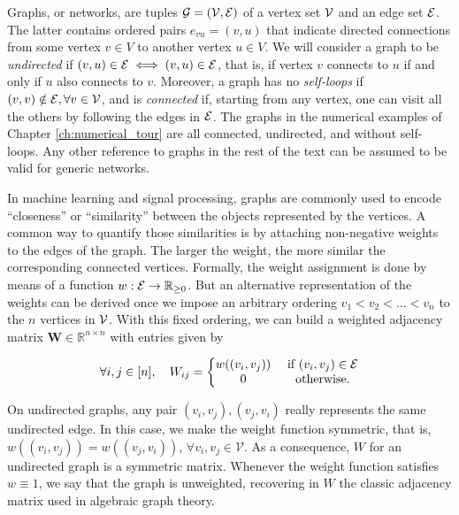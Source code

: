 Graphs, or networks, are tuples $\mathcal{G} = (\mathcal{V}, \mathcal{E})$ of a vertex set $\mathcal{V}$ and an edge set $\mathcal{E}$. The latter contains ordered pairs $e_{vu} = (v, u)$ that indicate directed connections from some vertex $v \in V$ to another vertex $u \in V$. We will consider a graph to be \textit{undirected} if $(v, u) \in \mathcal{E} \iff (v, u) \in \mathcal{E}$, that is, if vertex $v$ connects to $u$ if and only if $u$ also connects to $v$. Moreover, a graph has no \emph{self-loops} if $(v, v) \notin \mathcal{E}, \forall v \in \mathcal{V}$, and is \emph{connected} if, starting from any vertex, one can visit all the others by following the edges in $\mathcal{E}$. The graphs in the numerical examples of Chapter \ref{ch:numerical_tour} are all connected, undirected, and without self-loops. Any other reference to graphs in the rest of the text can be assumed to be valid for generic networks.

In machine learning and signal processing, graphs are commonly used to encode ``closeness'' or ``similarity'' between the objects represented by the vertices. A common way to quantify those similarities is by attaching non-negative weights to the edges of the graph. The larger the weight, the more similar the corresponding connected vertices. Formally, the weight assignment is done by means of a function $w : \mathcal{E} \to \mathbb{R}_{\ge 0}$. But an alternative representation of the weights can be derived once we impose an arbitrary ordering $v_1 < v_2 < \dots < v_n$ to the $n$ vertices in $\mathcal{V}$. With this fixed ordering, we can build a weighted adjacency matrix $\mathbf{W} \in \mathbb{R}^{n \times n}$ with entries given by

\begin{equation*}
    \forall i,j \in [n], \quad W_{ij} = \left \{
        \begin{matrix}
            w((v_i, v_j)) & \text{ if } (v_i, v_j) \in \mathcal{E} \\
            0 & \text{ otherwise}.
        \end{matrix}
    \right.
\end{equation*}

On undirected graphs, any pair $(v_i, v_j), (v_j, v_i)$ really represents the same undirected edge. In this case, we make the weight function symmetric, that is, $w((v_i, v_j)) = w((v_j, v_i))$, $\forall v_i, v_j \in \mathcal{V}$. As a consequence, $W$ for an undirected graph is a symmetric matrix. Whenever the weight function satisfies $w \equiv 1$, we say that the graph is unweighted, recovering in $W$ the classic adjacency matrix used in algebraic graph theory.

